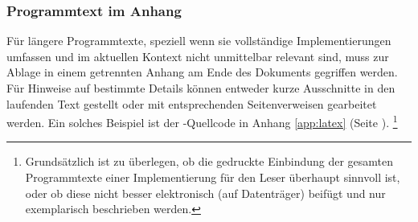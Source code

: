 \subsubsection{Programmtext im Anhang}

Für längere Programmtexte, speziell wenn sie vollständige
Implementierungen umfassen und im aktuellen Kontext nicht
unmittelbar relevant sind, muss zur Ablage in einem getrennten
Anhang am Ende des Dokuments gegriffen werden. Für Hinweise auf bestimmte
Details können entweder kurze Ausschnitte in den laufenden Text
gestellt oder mit entsprechenden Seitenverweisen gearbeitet werden. Ein
solches Beispiel ist der \latex-Quellcode in Anhang
\ref{app:latex} (Seite \pageref{app:latex}).%
\footnote{%
Grundsätzlich ist zu überlegen, ob die gedruckte Einbindung der gesamten
Programmtexte einer Implementierung für den Leser überhaupt sinnvoll ist, oder
ob diese nicht besser elektronisch (auf Datenträger) beifügt und nur exemplarisch
beschrieben werden.}